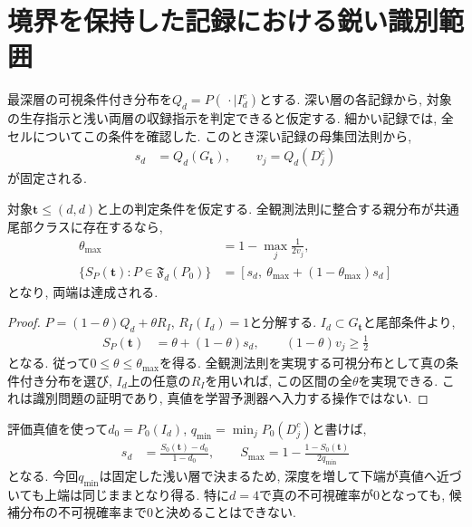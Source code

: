 \section{境界を保持した記録における鋭い識別範囲}
\label{sec:stage23_identification_formula}

最深層の可視条件付き分布を$Q_d=P(\,\cdot\mid I_d^c)$とする.
深い層の各記録から, 対象の生存指示と浅い両層の収録指示を判定できると仮定する.
細かい記録では, 全セルについてこの条件を確認した.
このとき深い記録の母集団法則から,
\begin{align}
s_d&=Q_d(G_{\bm t}),\qquad
v_j=Q_d(D_j^c)
\label{eq:stage23_visible_targets}
\end{align}
が固定される.

\begin{proposition}[最深層の記録が必要な指示を判定できる場合]
\label{prop:stage23_sharp_range}
対象$\bm t\le(d,d)$と上の判定条件を仮定する.
全観測法則に整合する親分布が共通尾部クラスに存在するなら,
\begin{align}
\theta_{\max}&=1-\max_j\frac{1}{2v_j},
\label{eq:stage23_theta_max}\\
\{S_P(\bm t):P\in\mathfrak F_d(P_0)\}
&=\left[s_d,\ \theta_{\max}+(1-\theta_{\max})s_d\right]
\label{eq:stage23_sharp_range}
\end{align}
となり, 両端は達成される.
\end{proposition}
\begin{proof}
$P=(1-\theta)Q_d+\theta R_I$, $R_I(I_d)=1$と分解する.
$I_d\subset G_{\bm t}$と尾部条件より,
\begin{align}
S_P(\bm t)&=\theta+(1-\theta)s_d,\qquad
(1-\theta)v_j\ge\frac12
\label{eq:stage23_mixture_constraints}
\end{align}
となる. 従って$0\le\theta\le\theta_{\max}$を得る.
全観測法則を実現する可視分布として真の条件付き分布を選び,
$I_d$上の任意の$R_I$を用いれば, この区間の全$\theta$を実現できる.
これは識別問題の証明であり, 真値を学習予測器へ入力する操作ではない.
\end{proof}

評価真値を使って$d_0=P_0(I_d)$,
$q_{\min}=\min_jP_0(D_j^c)$と書けば,
\begin{align}
s_d&=\frac{S_0(\bm t)-d_0}{1-d_0},\qquad
S_{\max}=1-\frac{1-S_0(\bm t)}{2q_{\min}}
\label{eq:stage23_true_law_expression}
\end{align}
となる.
今回$q_{\min}$は固定した浅い層で決まるため,
深度を増して下端が真値へ近づいても上端は同じままとなり得る.
特に$d=4$で真の不可視確率が0となっても,
候補分布の不可視確率まで0と決めることはできない.

